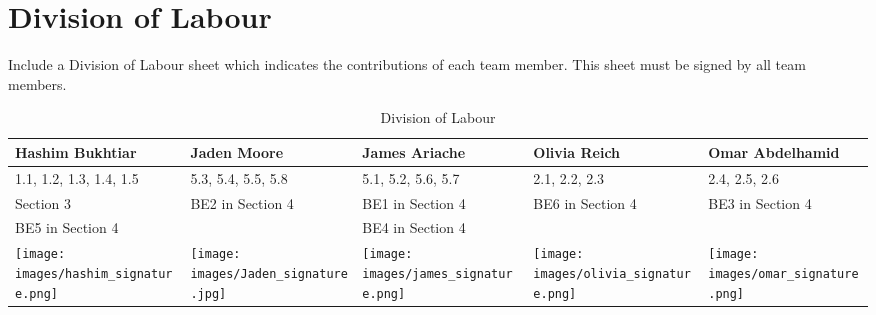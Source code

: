 \documentclass[]{article}
\begin{document}

\appendix
\section{Division of Labour}
\label{sec:division_of_labour}
Include a Division of Labour sheet which indicates the contributions of each team member. This sheet must be signed by all team members.

\begin{table}[h!]
\centering
\begin{tabular}{|p{3cm}|p{3cm}|p{3cm}|p{3cm}|p{3cm}|}
\hline
Hashim Bukhtiar & Jaden Moore & James Ariache & Olivia Reich & Omar Abdelhamid \\ \hline
1.1, 1.2, 1.3, 1.4, 1.5 & 5.3, 5.4, 5.5, 5.8 & 5.1, 5.2, 5.6, 5.7 & 2.1, 2.2, 2.3 & 2.4, 2.5, 2.6 \\ 
Section 3 & BE2 in Section 4 & BE1 in Section 4 & BE6 in Section 4 & BE3 in Section 4 \\ 
BE5 in Section 4 & & BE4 in Section 4 & & \\ \hline
\texttt{[image: images/hashim\_signature.png]} & \texttt{[image: images/Jaden\_signature.jpg]} &
\texttt{[image: images/james\_signature.png]}& \texttt{[image: images/olivia\_signature.png]} & \texttt{[image: images/omar\_signature.png]}  \\
\hline
\end{tabular}
\caption{Division of Labour} 
\label{tab:division_of_labour}
\end{table}


\end{document}
